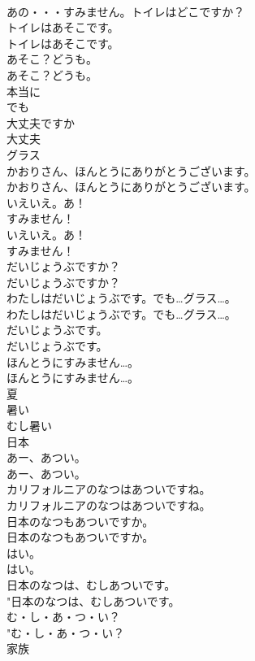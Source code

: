 \documentclass[8pt]{extreport}
\begin{document}
\begin{CJK}{UTF8}{min}
\\	あの・・・すみません。トイレはどこですか？ 
\\	トイレはあそこです。	
\\	トイレはあそこです。 
\\	あそこ？どうも。
\\	あそこ？どうも。
\\	本当に
\\	でも
\\	大丈夫ですか
\\	大丈夫
\\	グラス
\\	かおりさん、ほんとうにありがとうございます。	
\\	かおりさん、ほんとうにありがとうございます。 
\\	いえいえ。あ！
\\	すみません！	
\\	いえいえ。あ！
\\	すみません！ 
\\	だいじょうぶですか？	
\\	だいじょうぶですか？ 
\\	わたしはだいじょうぶです。でも…グラス…。	
\\	わたしはだいじょうぶです。でも…グラス…。 
\\	だいじょうぶです。	
\\	だいじょうぶです。 
\\	ほんとうにすみません…。	
\\	ほんとうにすみません…。 
\\	夏
\\	暑い
\\	むし暑い
\\	日本
\\	あー、あつい。	
\\	あー、あつい。 
\\	カリフォルニアのなつはあついですね。	
\\	カリフォルニアのなつはあついですね。 
\\	日本のなつもあついですか。	
\\	日本のなつもあついですか。 
\\	はい。	
\\	はい。 
\\	日本のなつは、むしあついです。	
\\	"日本のなつは、むしあついです。 
\\	む・し・あ・つ・い？	
\\	"む・し・あ・つ・い？ 
\\	家族

\end{CJK}
\end{document}
